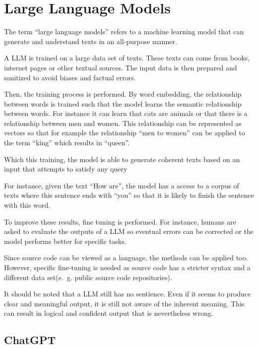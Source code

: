 \section{Large Language Models}

The term \enquote{large language models} refers to a machine learning model that can generate and understand texts in an all-purpose manner. 

A \ac{LLM} is trained on a large data set of texts. These texts can come from books, internet pages or other textual sources. The input data is then prepared and sanitized to avoid biases and factual errors.


Then, the training process is performed. By word embedding, the relationship between words is trained such that the model learns the semantic relationship between words. For instance it can learn that cats are animals  or that there is a relationship between men and women. This relationship can be represented as vectors so that for example the relationship \enquote{men to women} can be applied to the term \enquote{king} which results in \enquote{queen}.

Which this training, the model is able to generate coherent texts based on an input that attempts to satisfy any query


For instance, given the text \enquote{How are}, the model  has a access to a corpus of texts where this sentence ends with \enquote{you} so that it is likely to finish the sentence with this word. 

To improve these results, fine tuning is performed. For instance, humans are asked to evaluate the outputs of a \ac{LLM} so eventual errors can be corrected or the model performs better for specific tasks.



Since source code can be viewed as a language, the methods can be applied too. However, specific fine-tuning is needed as source code  has a stricter syntax and a different data set(e.~g. public source code repositories).

It should be noted that a \ac{LLM} still has no sentience. Even if it seems to produce clear and meaningful output, it is still not aware of the inherent meaning. This can result in logical and confident output that is nevertheless wrong. \cite{Amaratunga2023}

\subsection{ChatGPT}
\label{sec:chatgpt}


